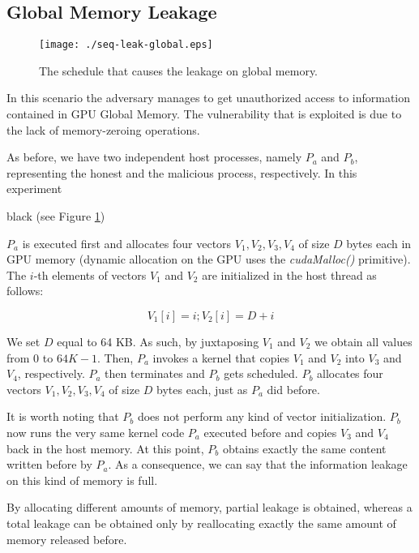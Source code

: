 \documentclass[11pt,onecolumn,letterpaper]{IEEEtran}
\newcommand{\clr}{black}
\begin{document}
\subsection{Global Memory Leakage}
\label{sub:glbmem_attack}
	\begin{figure}[t]
		\begin{center}

		\texttt{[image: ./seq-leak-global.eps]}
		\caption{The schedule that causes the leakage on global memory. }
		\label{fig:glbmem_attack}
	\end{center}
\end{figure}

In this scenario the adversary manages to get unauthorized access to information contained in GPU Global Memory.
The vulnerability that is exploited is due to the lack of memory-zeroing operations. 

As before, we have two independent host processes, namely $P_a$ and $P_b$, representing the honest and the malicious process, respectively.
In this experiment \begin{color}{\clr}
(see Figure \ref{fig:glbmem_attack})
\end{color}
 $P_a$ is executed first and allocates four vectors $V_1, V_2, V_3, V_4$ of size $D$ bytes each in GPU memory
(dynamic allocation on the GPU uses the \emph{cudaMalloc()} primitive).
The $i$-th elements of vectors $V_1$ and $V_2$ are initialized in the host thread as follows:

$$ V_1[i] = i ; V_2[i] = D + i $$

We set $D$ equal to 64 KB.
As such, by juxtaposing $V_1$ and $V_2$ we obtain all values from $0$ to $64K - 1$.
Then, $P_a$ invokes a kernel that copies $V_1$ and $V_2$ into $V_3$ and $V_4$, respectively.
$P_a$ then terminates and $P_b$ gets scheduled.
$P_b$ allocates four vectors $V_1, V_2, V_3, V_4$ of size $D$ bytes each, just as $P_a$ did before.

It is worth noting that $P_b$ does not perform any kind of vector initialization.
$P_b$ now runs the very same kernel code $P_a$ executed before and copies $V_3$ and $V_4$ back in the host memory.
At this point, 
$P_b$ obtains exactly the same content written before by $P_a$.
As a consequence, we can say that the information leakage on this kind of memory is full.

By allocating different amounts of memory, partial leakage is obtained,
whereas a total leakage can be obtained only by reallocating exactly the same amount of memory released before.
\end{document}
